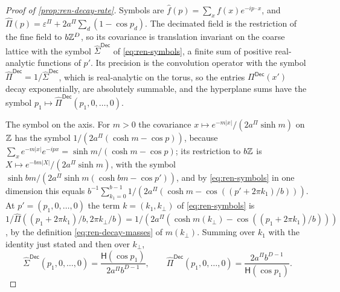 \begin{proof}[Proof of \cref{prop:ren-decay-rate}]
Symbols are $\hat f(p)=\sum_xf(x)e^{-ip\cdot x}$, and $\hat\Pi(p)=\varepsilon^\Pi+2a^\Pi\sum_d(1-\cos p_d)$. The decimated field is the restriction of the fine field to $b\mathbb{Z}^D$, so its covariance is translation invariant on the coarse lattice with the symbol $\hat\Sigma^{\mathsf{Dec}}$ of \eqref{eq:ren-symbols}, a finite sum of positive real-analytic functions of $p'$. Its precision is the convolution operator with the symbol $\hat\Pi^{\mathsf{Dec}}=1/\hat\Sigma^{\mathsf{Dec}}$, which is real-analytic on the torus, so the entries $\Pi^{\mathsf{Dec}}(x')$ decay exponentially, are absolutely summable, and the hyperplane sums have the symbol $p_1\mapsto\hat\Pi^{\mathsf{Dec}}(p_1,0,\dots,0)$.

The symbol on the axis. For $m>0$ the covariance $x\mapsto e^{-m\lvert x\rvert}/(2a^\Pi\sinh m)$ on $\mathbb{Z}$ has the symbol $1/(2a^\Pi(\cosh m-\cos p))$, because $\sum_xe^{-m\lvert x\rvert}e^{-ipx}=\sinh m/(\cosh m-\cos p)$; its restriction to $b\mathbb{Z}$ is $X\mapsto e^{-bm\lvert X\rvert}/(2a^\Pi\sinh m)$, with the symbol $\sinh bm/(2a^\Pi\sinh m(\cosh bm-\cos p'))$, and by \eqref{eq:ren-symbols} in one dimension this equals $b^{-1}\sum_{k_1=0}^{b-1}1/(2a^\Pi(\cosh m-\cos((p'+2\pi k_1)/b)))$. At $p'=(p_1,0,\dots,0)$ the term $k=(k_1,k_\perp)$ of \eqref{eq:ren-symbols} is $1/\hat\Pi((p_1+2\pi k_1)/b,2\pi k_\perp/b)=1/(2a^\Pi(\cosh m(k_\perp)-\cos((p_1+2\pi k_1)/b)))$, by the definition \eqref{eq:ren-decay-masses} of $m(k_\perp)$. Summing over $k_1$ with the identity just stated and then over $k_\perp$,
\begin{equation}\label{eq:ren-decay-axis-symbol}
\hat\Sigma^{\mathsf{Dec}}(p_1,0,\dots,0)=\frac{\mathsf H(\cos p_1)}{2a^\Pi b^{D-1}},\qquad\hat\Pi^{\mathsf{Dec}}(p_1,0,\dots,0)=\frac{2a^\Pi b^{D-1}}{\mathsf H(\cos p_1)}.
\end{equation}


\end{proof}
